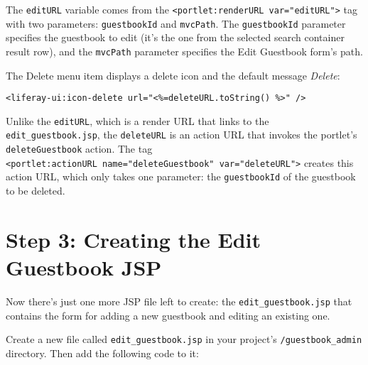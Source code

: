 The \texttt{editURL} variable comes from the
\texttt{\textless{}portlet:renderURL\ var="editURL"\textgreater{}} tag
with two parameters: \texttt{guestbookId} and \texttt{mvcPath}. The
\texttt{guestbookId} parameter specifies the guestbook to edit (it's the
one from the selected search container result row), and the
\texttt{mvcPath} parameter specifies the Edit Guestbook form's path.

The Delete menu item displays a delete icon and the default message
\emph{Delete}:

\begin{verbatim}
<liferay-ui:icon-delete url="<%=deleteURL.toString() %>" />
\end{verbatim}

Unlike the \texttt{editURL}, which is a render URL that links to the
\texttt{edit\_guestbook.jsp}, the \texttt{deleteURL} is an action URL
that invokes the portlet's \texttt{deleteGuestbook} action. The tag
\texttt{\textless{}portlet:actionURL\ name="deleteGuestbook"\ var="deleteURL"\textgreater{}}
creates this action URL, which only takes one parameter: the
\texttt{guestbookId} of the guestbook to be deleted.

\section{Step 3: Creating the Edit Guestbook
JSP}\label{step-3-creating-the-edit-guestbook-jsp}

Now there's just one more JSP file left to create: the
\texttt{edit\_guestbook.jsp} that contains the form for adding a new
guestbook and editing an existing one.

Create a new file called \texttt{edit\_guestbook.jsp} in your project's
\texttt{/guestbook\_admin} directory. Then add the following code to it:

